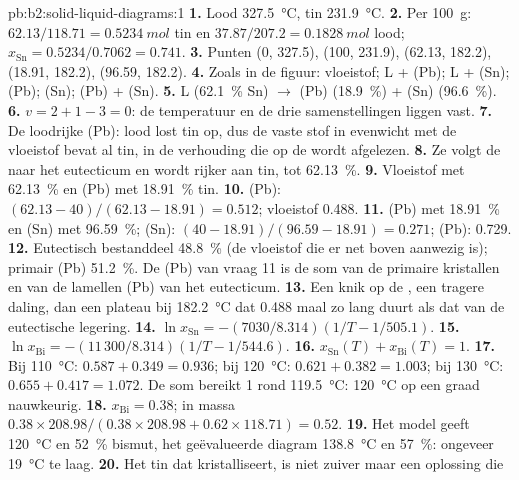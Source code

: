 \begin{solution}{pb:b2:solid-liquid-diagrams:1}
\textbf{1.} Lood \qty{327.5}{\degreeCelsius}, tin \qty{231.9}{\degreeCelsius}.
\textbf{2.} Per \qty{100}{g}: $62.13/118.71 = \qty{0.5234}{mol}$ tin en
$37.87/207.2 = \qty{0.1828}{mol}$ lood; $x_{\mathrm{Sn}} = 0.5234/0.7062 =
0.741$.
\textbf{3.} Punten (0, 327.5), (100, 231.9), (62.13, 182.2), (18.91, 182.2),
(96.59, 182.2).
\textbf{4.} Zoals in de figuur: vloeistof; L + (Pb); L + (Sn); (Pb); (Sn); (Pb) + (Sn).
\textbf{5.} L (62.1~\% Sn) $\longrightarrow$ (Pb) (18.9~\%) + (Sn) (96.6~\%).
\textbf{6.} $v = 2 + 1 - 3 = 0$: de temperatuur en de drie samenstellingen liggen
vast.
\textbf{7.} De loodrijke  (Pb): lood lost tin op, dus de vaste stof in
evenwicht met de vloeistof bevat al tin, in de verhouding die op de
 wordt afgelezen.
\textbf{8.} Ze volgt de  naar het eutecticum en wordt rijker aan tin,
tot 62.13~\%.
\textbf{9.} Vloeistof met 62.13~\% en (Pb) met 18.91~\% tin.
\textbf{10.} (Pb): $(62.13 - 40)/(62.13 - 18.91) = 0.512$; vloeistof 0.488.
\textbf{11.} (Pb) met 18.91~\% en (Sn) met 96.59~\%; (Sn): $(40 - 18.91)/(96.59 -
18.91) = 0.271$; (Pb): 0.729.
\textbf{12.} Eutectisch bestanddeel 48.8~\% (de vloeistof die er net boven aanwezig is);
primair (Pb) 51.2~\%. De (Pb) van vraag 11 is de som van de primaire
kristallen en van de lamellen (Pb) van het eutecticum.
\textbf{13.} Een knik op de , een tragere daling, dan een plateau bij
\qty{182.2}{\degreeCelsius} dat 0.488 maal zo lang duurt als dat van de eutectische legering.
\textbf{14.} $\ln x_{\mathrm{Sn}} = -(7030/8.314)(1/T - 1/505.1)$.
\textbf{15.} $\ln x_{\mathrm{Bi}} = -(11\,300/8.314)(1/T - 1/544.6)$.
\textbf{16.} $x_{\mathrm{Sn}}(T) + x_{\mathrm{Bi}}(T) = 1$.
\textbf{17.} Bij \qty{110}{\degreeCelsius}: $0.587 + 0.349 = 0.936$; bij
\qty{120}{\degreeCelsius}: $0.621 + 0.382 = 1.003$; bij
\qty{130}{\degreeCelsius}: $0.655 + 0.417 = 1.072$. De som bereikt 1 rond
\qty{119.5}{\degreeCelsius}: \qty{120}{\degreeCelsius} op een graad nauwkeurig.
\textbf{18.} $x_{\mathrm{Bi}} = 0.38$; in massa $0.38 \times 208.98/(0.38 \times
208.98 + 0.62 \times 118.71) = 0.52$.
\textbf{19.} Het model geeft \qty{120}{\degreeCelsius} en 52~\% bismut, het
geëvalueerde diagram \qty{138.8}{\degreeCelsius} en 57~\%: ongeveer
\qty{19}{\degreeCelsius} te laag.
\textbf{20.} Het tin dat kristalliseert, is niet zuiver maar een oplossing die

\end{solution}
